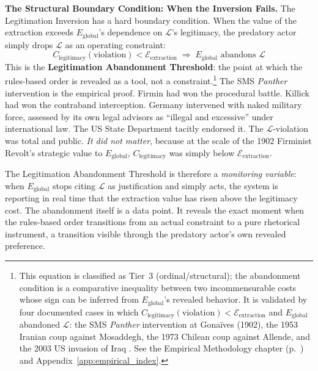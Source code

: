 \textbf{The Structural Boundary Condition: When the Inversion Fails.} The Legitimation Inversion has a hard boundary condition. When the value of the extraction exceeds $E_{\text{global}}$'s dependence on $\mathcal{L}$'s legitimacy, the predatory actor simply drops $\mathcal{L}$ as an operating constraint:
\begin{equation}\label{eq:13.11-legitimation-abandonment-condition}
C_{\text{legitimacy}}(\text{violation}) < \mathcal{E}_{\text{extraction}} \;\Rightarrow\; E_{\text{global}} \text{ abandons } \mathcal{L}
\end{equation}
This is the \textbf{Legitimation Abandonment Threshold}: the point at which the rules-based order is revealed as a tool, not a constraint.\footnote{This equation is classified as Tier~3 (ordinal/structural); the abandonment condition is a comparative inequality between two incommensurable costs whose sign can be inferred from $E_{\text{global}}$'s revealed behavior. It is validated by four documented cases in which $C_{\text{legitimacy}}(\text{violation}) < \mathcal{E}_{\text{extraction}}$ and $E_{\text{global}}$ abandoned $\mathcal{L}$: the SMS \textit{Panther} intervention at Gonaïves (1902), the 1953 Iranian coup against Mosaddegh, the 1973 Chilean coup against Allende, and the 2003 US invasion of Iraq \cite{firmin_legacy, rodney, acemoglu_robinson}. See the Empirical Methodology chapter (p.~\pageref{ch:empirical_methodology}) and Appendix~\ref{app:empirical_index}.} The SMS \textit{Panther} intervention is the empirical proof. Firmin had won the procedural battle. Killick had won the contraband interception. Germany intervened with naked military force, assessed by its own legal advisors as ``illegal and excessive'' under international law. The US State Department tacitly endorsed it. The $\mathcal{L}$-violation was total and public. \textit{It did not matter}, because at the scale of the 1902 Firminist Revolt's strategic value to $E_{\text{global}}$, $C_{\text{legitimacy}}$ was simply below $\mathcal{E}_{\text{extraction}}$.

The Legitimation Abandonment Threshold is therefore a \textit{monitoring variable}: when $E_{\text{global}}$ stops citing $\mathcal{L}$ as justification and simply acts, the system is reporting in real time that the extraction value has risen above the legitimacy cost. The abandonment itself is a data point. It reveals the exact moment when the rules-based order transitions from an actual constraint to a pure rhetorical instrument, a transition visible through the predatory actor's own revealed preference.

